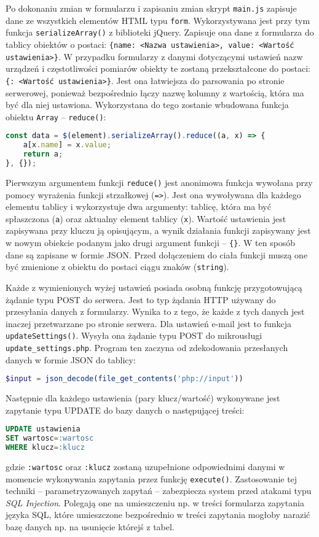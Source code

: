 \documentclass[a4paper,11pt,twoside]{article}
\begin{document}
Po dokonaniu zmian w formularzu i zapisaniu zmian skrypt \texttt{main.js} zapisuje dane ze wszystkich elementów HTML typu \texttt{form}. Wykorzystywana jest przy tym funkcja \linebreak \texttt{serializeArray()} z biblioteki jQuery. Zapisuje ona dane z formularza do tablicy obiektów o postaci: \texttt{\{name: <Nazwa ustawienia>, value: <Wartość ustawienia>\}}. W przypadku formularzy z danymi dotyczącymi ustawień nazw urządzeń i częstotliwości pomiarów obiekty te zostaną przekształcone do postaci: \texttt{\{<Nazwa ustawienia>: <Wartość ustawienia>\}}. Jest ona łatwiejsza do parsowania po stronie serwerowej, ponieważ bezpośrednio łączy nazwę kolumny z wartością, która ma być dla niej ustawiona. Wykorzystana do tego zostanie wbudowana funkcja obiektu \texttt{Array} -- \texttt{reduce()}:
\begin{lstlisting}[language=JavaScript]
const data = $(element).serializeArray().reduce((a, x) => {
	a[x.name] = x.value;
	return a;
}, {});
\end{lstlisting}
Pierwszym argumentem funkcji \texttt{reduce()} jest anonimowa funkcja wywołana przy pomocy wyrażenia funkcji strzałkowej (\texttt{=>}). Jest ona wywoływana dla każdego elementu tablicy i wykorzystuje dwa argumenty: tablicę, która ma być spłaszczona (\texttt{a}) oraz aktualny element tablicy (\texttt{x}). Wartość ustawienia jest zapisywana przy kluczu ją opisującym, a wynik działania funkcji zapisywany jest w nowym obiekcie podanym jako drugi argument funkcji -- \texttt{\{\}}. W ten sposób dane są zapisane w formie JSON. Przed dołączeniem do ciała funkcji muszą one być zmienione z obiektu do postaci ciągu znaków (\texttt{string}).

Każde z wymienionych wyżej ustawień posiada osobną funkcję przygotowującą żądanie typu POST do serwera. Jest to typ żądania HTTP używany do przesyłania danych z formularzy.\cite{http} Wynika to z tego, że każde z tych danych jest inaczej przetwarzane po stronie serwera. Dla ustawień e-mail jest to funkcja \texttt{updateSettings()}. Wysyła ona żądanie typu POST do mikrousługi \texttt{update{\_}settings.php}. Program ten zaczyna od zdekodowania przesłanych danych w formie JSON do tablicy:
\begin{lstlisting}[language=PHP]
$input = json_decode(file_get_contents('php://input'))
\end{lstlisting}
Następnie dla każdego ustawienia (pary klucz/wartość) wykonywane jest zapytanie typu UPDATE do bazy danych o następującej treści:
\begin{lstlisting}[language=SQL]
UPDATE ustawienia 
SET wartosc=:wartosc
WHERE klucz=:klucz
\end{lstlisting}
gdzie \texttt{:wartosc} oraz \texttt{:klucz} zostaną uzupełnione odpowiednimi danymi w momencie wykonywania zapytania przez funkcję \texttt{execute()}. Zastosowanie tej techniki -- parametryzowanych zapytań -- zabezpiecza system przed atakami typu \textit{SQL Injection}. Polegają one na umieszczeniu np. w treści formularza zapytania języka SQL, które umieszczone bezpośrednio w treści zapytania mogłoby narazić bazę danych np. na usunięcie którejś z tabel.\cite{sql-injection}
\end{document}
